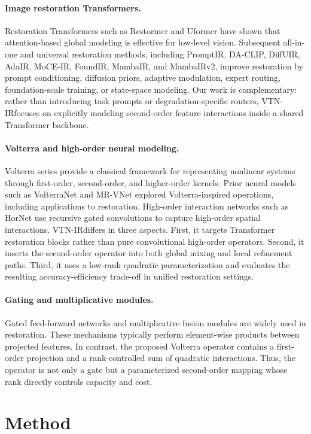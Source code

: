 \documentclass[10pt,twocolumn]{article}
\newcommand{\ours}{VTN-IR}
\begin{document}
\paragraph{Image restoration Transformers.}
Restoration Transformers such as Restormer and Uformer have shown that attention-based global modeling is effective for low-level vision. Subsequent all-in-one and universal restoration methods, including PromptIR, DA-CLIP, DiffUIR, AdaIR, MoCE-IR, FoundIR, MambaIR, and MambaIRv2, improve restoration by prompt conditioning, diffusion priors, adaptive modulation, expert routing, foundation-scale training, or state-space modeling. Our work is complementary: rather than introducing task prompts or degradation-specific routers, \ours focuses on explicitly modeling second-order feature interactions inside a shared Transformer backbone.

\paragraph{Volterra and high-order neural modeling.}
Volterra series provide a classical framework for representing nonlinear systems through first-order, second-order, and higher-order kernels. Prior neural models such as VolterraNet and MR-VNet explored Volterra-inspired operations, including applications to restoration. High-order interaction networks such as HorNet use recursive gated convolutions to capture high-order spatial interactions. \ours differs in three aspects. First, it targets Transformer restoration blocks rather than pure convolutional high-order operators. Second, it inserts the second-order operator into both global mixing and local refinement paths. Third, it uses a low-rank quadratic parameterization and evaluates the resulting accuracy-efficiency trade-off in unified restoration settings.

\paragraph{Gating and multiplicative modules.}
Gated feed-forward networks and multiplicative fusion modules are widely used in restoration. These mechanisms typically perform element-wise products between projected features. In contrast, the proposed Volterra operator contains a first-order projection and a rank-controlled sum of quadratic interactions. Thus, the operator is not only a gate but a parameterized second-order mapping whose rank directly controls capacity and cost.

\section{Method}
\end{document}
